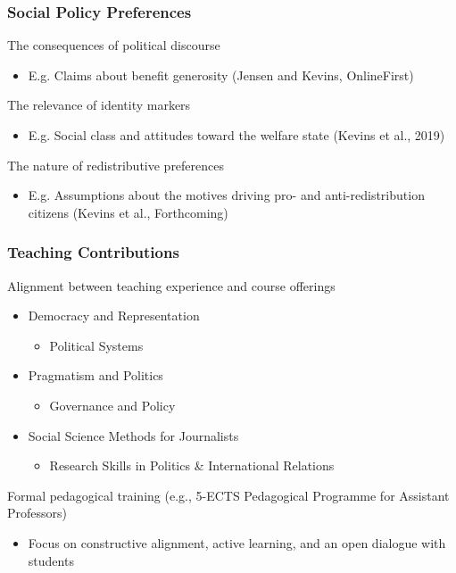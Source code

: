 \documentclass[14pt]{beamer}
\begin{document}
\begin{frame}
	\pause
	\frametitle{Social Policy Preferences}
	The consequences of political discourse
	\begin{itemize}
		\pause
		\item E.g. Claims about benefit generosity (Jensen and Kevins, OnlineFirst)
	\end{itemize}
	\pause
	The relevance of identity markers 
	\begin{itemize}
		\pause
		\item E.g. Social class and attitudes toward the welfare state (Kevins et al., 2019)
	\end{itemize}
	\pause
	The nature of redistributive preferences
	\begin{itemize}
		\pause
		\item E.g. Assumptions about the motives driving pro- and anti-redistribution citizens (Kevins et al., Forthcoming)
	\end{itemize}
\end{frame}

\begin{frame}
	\frametitle{Teaching Contributions}
	\pause
	Alignment between teaching experience and course offerings
	\begin{itemize}
		\pause
		\item Democracy and Representation 
		\begin{itemize}
			\pause
			\item Political Systems
		\end{itemize}
		\pause
		\item Pragmatism and Politics
		\begin{itemize}
			\pause
			\item Governance and Policy
		\end{itemize}
		\pause
		\item Social Science Methods for Journalists
		\begin{itemize}
			\pause
			\item Research Skills in Politics \& International Relations
		\end{itemize}
	\end{itemize}
	\pause
	\bigskip
	Formal pedagogical training (e.g., 5-ECTS Pedagogical Programme for Assistant Professors)
	\begin{itemize}
		\pause
		\item Focus on constructive alignment, active learning, and an open dialogue with students
	\end{itemize}
\end{frame}
\end{document}
